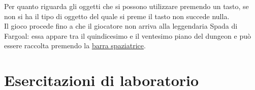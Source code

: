 \documentclass{report}
\begin{document}
%
Per quanto riguarda gli oggetti che si possono utilizzare premendo un tasto, se non si ha il tipo di oggetto del quale si preme il tasto non succede nulla.
%
\\
%
Il gioco procede fino a che il giocatore non arriva alla leggendaria Spada di Fargoal: essa appare tra il quindicesimo e il ventesimo piano del dungeon e può essere raccolta premendo la \underline{barra spaziatrice}.


\chapter{Esercitazioni di laboratorio}
\end{document}
